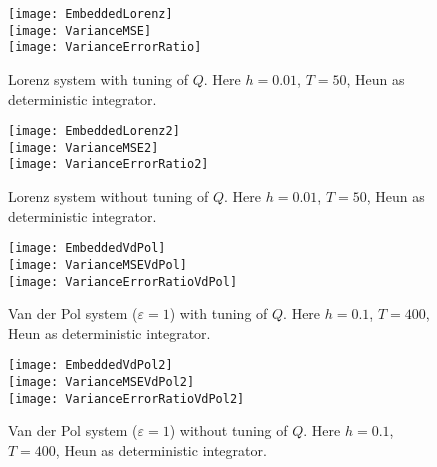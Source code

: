 \documentclass{siamart1116}
\numberwithin{theorem}{section}
\newcommand{\epl}{\varepsilon}
\begin{document}
\begin{figure}
	\centering
	\texttt{[image: EmbeddedLorenz]} \\
	\texttt{[image: VarianceMSE]} \\
	\texttt{[image: VarianceErrorRatio]}
	\caption{Lorenz system with tuning of $Q$. Here $h = 0.01$, $T = 50$, Heun as deterministic integrator.}
\end{figure}

\begin{figure}
	\centering
	\texttt{[image: EmbeddedLorenz2]} \\
	\texttt{[image: VarianceMSE2]} \\
	\texttt{[image: VarianceErrorRatio2]}
	\caption{Lorenz system without tuning of $Q$. Here $h = 0.01$, $T = 50$, Heun as deterministic integrator.}
\end{figure}
\begin{figure}
	\centering
	\texttt{[image: EmbeddedVdPol]} \\
	\texttt{[image: VarianceMSEVdPol]} \\
	\texttt{[image: VarianceErrorRatioVdPol]}
	\caption{Van der Pol system ($\epl = 1$) with tuning of $Q$. Here $h = 0.1$, $T = 400$, Heun as deterministic integrator.}
\end{figure}

\begin{figure}
	\centering
	\texttt{[image: EmbeddedVdPol2]} \\
	\texttt{[image: VarianceMSEVdPol2]} \\
	\texttt{[image: VarianceErrorRatioVdPol2]}
	\caption{Van der Pol system ($\epl = 1$) without tuning of $Q$. Here $h = 0.1$, $T = 400$, Heun as deterministic integrator.}
\end{figure}
\end{document}
